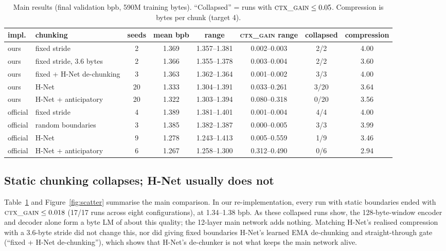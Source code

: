 \documentclass[10pt]{article}
\newcommand{\ctx}{\textsc{ctx\_gain}}
\newcommand{\bpb}{bpb}
\begin{document}
\begin{table}[t]
\centering
\small
\caption{Main results (final validation \bpb{}, 590M training bytes). ``Collapsed'' = runs with
$\ctx{}\le0.05$. Compression is bytes per chunk (target 4).}
\label{tab:main}
\begin{tabular}{llcccccc}
\toprule
impl. & chunking & seeds & mean \bpb{} & range & \ctx{} range & collapsed & compression\\
\midrule
ours & fixed stride & 2 & 1.369 & 1.357--1.381 & 0.002--0.003 & 2/2 & 4.00\\
ours & fixed stride, 3.6 bytes & 2 & 1.366 & 1.355--1.378 & 0.003--0.004 & 2/2 & 3.60\\
ours & fixed + H-Net de-chunking & 3 & 1.363 & 1.362--1.364 & 0.001--0.002 & 3/3 & 4.00\\
ours & H-Net & 20 & 1.333 & 1.304--1.391 & 0.033--0.261 & 3/20 & 3.64\\
ours & H-Net + anticipatory & 20 & 1.322 & 1.303--1.394 & 0.080--0.318 & 0/20 & 3.56\\
\midrule
official & fixed stride & 4 & 1.389 & 1.381--1.401 & 0.001--0.004 & 4/4 & 4.00\\
official & random boundaries & 3 & 1.385 & 1.382--1.387 & 0.000--0.005 & 3/3 & 3.99\\
official & H-Net & 9 & 1.278 & 1.243--1.413 & 0.005--0.559 & 1/9 & 3.46\\
official & H-Net + anticipatory & 6 & 1.267 & 1.258--1.300 & 0.312--0.490 & 0/6 & 2.94\\
\bottomrule
\end{tabular}
\end{table}

\subsection{Static chunking collapses; H-Net usually does not}

Table~\ref{tab:main} and Figure~\ref{fig:scatter} summarise the main comparison. In our
re-implementation, every run with static boundaries ended with $\ctx{}\le 0.018$ (17/17 runs across eight configurations), at 1.34--1.38 \bpb{}. As these collapsed runs show, the 128-byte-window encoder and decoder alone form a byte LM of about this quality; the 12-layer main network adds nothing. Matching
H-Net's realised compression with a 3.6-byte stride did not change this, nor did giving fixed
boundaries H-Net's learned EMA de-chunking and straight-through gate (``fixed + H-Net
de-chunking''), which shows that H-Net's de-chunker is not what keeps the main network alive.
\end{document}

